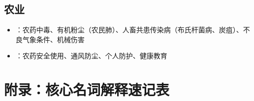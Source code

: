 \section{农业}

\begin{itemize}[leftmargin=*]
    \item {}：农药中毒、有机粉尘（农民肺）、人畜共患传染病（布氏杆菌病、炭疽）、不良气象条件、机械伤害
    \item {}：农药安全使用、通风防尘、个人防护、健康教育
\end{itemize}

\newpage

\chapter*{附录：核心名词解释速记表}

